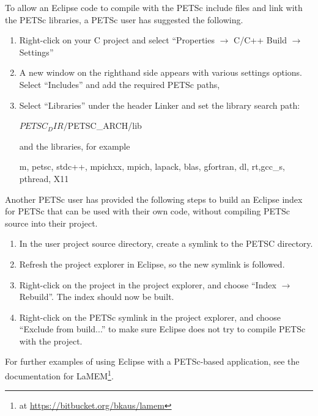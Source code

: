 {{{To allow an Eclipse code to compile with the PETSc include files and link with the PETSc libraries, a PETSc user has suggested the following.
\begin{enumerate}
  \item Right-click on your C project and select ``Properties $\rightarrow$ C/C++ Build $\rightarrow$ Settings''
\item A new window on the righthand side appears with various settings options.
Select ``Includes'' and add the required PETSc paths,
\item Select ``Libraries'' under the header Linker
and set the library search path:
\begin{bashlisting}
${PETSC_DIR}/${PETSC_ARCH}/lib
\end{bashlisting}
and the libraries, for example
\begin{bashlisting}
m, petsc, stdc++, mpichxx, mpich, lapack, blas, gfortran, dl, rt,gcc_s, pthread, X11
\end{bashlisting}
\end{enumerate}
Another PETSc user has provided the following steps to build an Eclipse index for PETSc that can be used with their own code, without compiling PETSc source into their project.
\begin{enumerate}
\item In the user project source directory, create a symlink to the PETSC  directory.
\item Refresh the project explorer in Eclipse, so the new symlink is followed.
\item Right-click on the project in the project explorer, and choose ``Index $\rightarrow$ Rebuild''. The index should now be built.
\item Right-click on the PETSc symlink in the project explorer, and choose ``Exclude from build...'' to make sure Eclipse does not try to compile PETSc with the project.
\end{enumerate}
For further examples of using Eclipse with a PETSc-based application, see the documentation for LaMEM\footnote{ at \url{https://bitbucket.org/bkaus/lamem}}.

}}}
